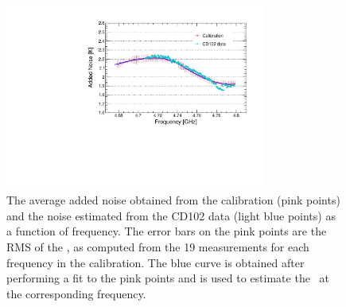 \begin{figure} [htbp]
  \centering
  \includegraphics[width=8.6cm]{figures/Avg_Noise_vs_Freq_run1to19_211118.pdf}
  \caption{The average added noise obtained from the calibration (pink points)
 and the noise estimated from the CD102 data (light blue points) as a 
function of frequency. The error bars on the pink points are the RMS 
of the \ta, as computed from the 19 measurements for each frequency 
in the calibration. 
The blue curve is obtained after performing a fit to 
the pink points and is used to estimate the \ta\ at the corresponding 
frequency.}
  \label{fig:hemtcalvsf}
\end{figure}


  

